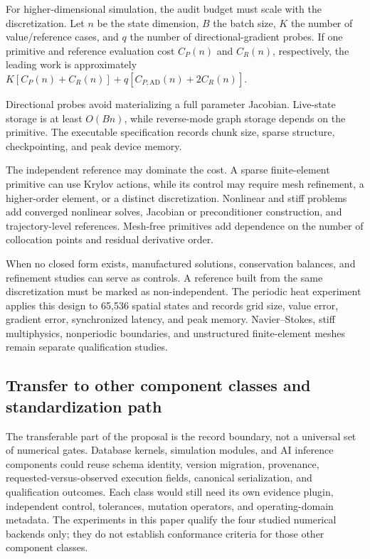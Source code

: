\documentclass[preprint,12pt]{elsarticle}
\begin{document}
For higher-dimensional simulation, the audit budget must scale with the discretization. Let $n$ be the state dimension, $B$ the batch size, $K$ the number of value/reference cases, and $q$ the number of directional-gradient probes. If one primitive and reference evaluation cost $C_P(n)$ and $C_R(n)$, respectively, the leading work is approximately $K[C_P(n)+C_R(n)]+q[C_{P,\mathrm{AD}}(n)+2C_R(n)]$.

Directional probes avoid materializing a full parameter Jacobian. Live-state storage is at least $O(Bn)$, while reverse-mode graph storage depends on the primitive. The executable specification records chunk size, sparse structure, checkpointing, and peak device memory.

The independent reference may dominate the cost. A sparse finite-element primitive can use Krylov actions, while its control may require mesh refinement, a higher-order element, or a distinct discretization. Nonlinear and stiff problems add converged nonlinear solves, Jacobian or preconditioner construction, and trajectory-level references. Mesh-free primitives add dependence on the number of collocation points and residual derivative order.

When no closed form exists, manufactured solutions, conservation balances, and refinement studies can serve as controls. A reference built from the same discretization must be marked as non-independent. The periodic heat experiment applies this design to 65,536 spatial states and records grid size, value error, gradient error, synchronized latency, and peak memory. Navier--Stokes, stiff multiphysics, nonperiodic boundaries, and unstructured finite-element meshes remain separate qualification studies.

\subsection{Transfer to other component classes and standardization path}
The transferable part of the proposal is the record boundary, not a universal set of numerical gates. Database kernels, simulation modules, and AI inference components could reuse schema identity, version migration, provenance, requested-versus-observed execution fields, canonical serialization, and qualification outcomes. Each class would still need its own evidence plugin, independent control, tolerances, mutation operators, and operating-domain metadata. The experiments in this paper qualify the four studied numerical backends only; they do not establish conformance criteria for those other component classes.
\end{document}

